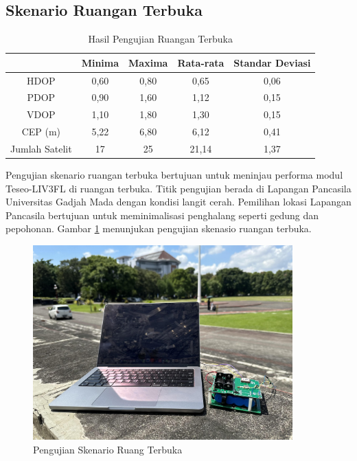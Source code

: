 \subsection{Skenario Ruangan Terbuka}
\begin{table}[H]
	\caption{Hasil Pengujian Ruangan Terbuka}
	\vspace{0.5em}
	\centering
	\begin{tabular}{ccccc}
		\hline
		& \textbf{Minima} & \textbf{Maxima} & \textbf{Rata-rata} & \textbf{Standar Deviasi}\\
		\hline 
		HDOP & 0,60 & 0,80 & 0,65 & 0,06 \\
		PDOP & 0,90 & 1,60 & 1,12 & 0,15 \\
		VDOP & 1,10	& 1,80 & 1,30 & 0,15 \\
		CEP (m) & 5,22 & 6,80 & 6,12 & 0,41 \\
		Jumlah Satelit & 17	& 25 & 21,14 & 1,37 \\
		\hline
	\end{tabular}
	\label{Tab: outdoor-table}
\end{table}

Pengujian skenario ruangan terbuka bertujuan untuk meninjau performa modul Teseo-LIV3FL di ruangan terbuka. Titik pengujian berada di Lapangan Pancasila Universitas Gadjah Mada dengan kondisi langit cerah. Pemilihan lokasi Lapangan Pancasila bertujuan untuk meminimalisasi penghalang seperti gedung dan pepohonan. Gambar \ref{Fig: outdoor-keadaan} menunjukan pengujian skenasio ruangan terbuka.

\begin{figure}[H]
	\centering
	\includegraphics[width=10cm]{contents/chapter-4/4-skenario-outdoor/keadaan.jpg}
	\caption{Pengujian Skenario Ruang Terbuka}
	\label{Fig: outdoor-keadaan}
\end{figure}

